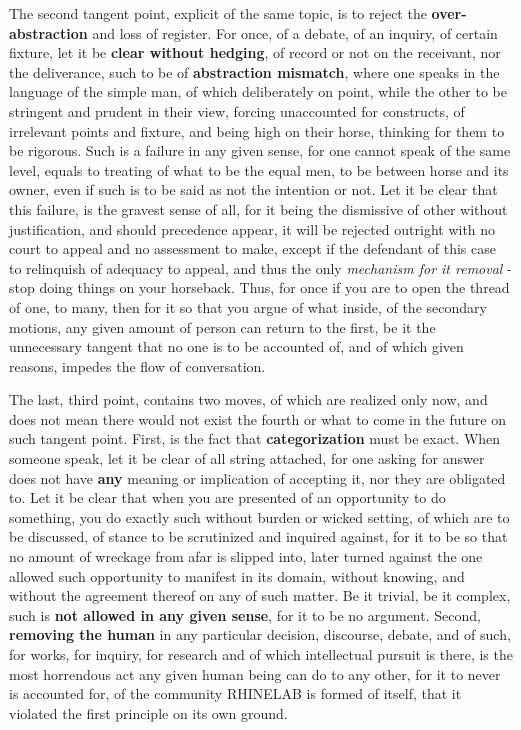 \documentclass[10pt,a4paper]{article}
\begin{document}
The second tangent point, explicit of the same topic, is to reject the \textbf{over-abstraction} and loss of register. For once, of a debate, of an inquiry, of certain fixture, let it be \textbf{clear without hedging}, of record or not on the receivant, nor the deliverance, such to be of \textbf{abstraction mismatch}, where one speaks in the language of the simple man, of which deliberately on point, while the other to be stringent and prudent in their view, forcing unaccounted for constructs, of irrelevant points and fixture, and being high on their horse, thinking for them to be rigorous. Such is a failure in any given sense, for one cannot speak of the same level, equals to treating of what to be the equal men, to be between horse and its owner, even if such is to be said as not the intention or not. Let it be clear that this failure, is the gravest sense of all, for it being the dismissive of other without justification, and should precedence appear, it will be rejected outright with no court to appeal and no assessment to make, except if the defendant of this case to relinquish of adequacy to appeal, and thus the only \textit{mechanism for it removal} - stop doing things on your horseback. Thus, for once if you are to open the thread of one, to many, then for it so that you argue of what inside, of the secondary motions, any given amount of person can return to the first, be it the unnecessary tangent that no one is to be accounted of, and of which given reasons, impedes the flow of conversation. 

The last, third point, contains two moves, of which are realized only now, and does not mean there would not exist the fourth or what to come in the future on such tangent point. First, is the fact that \textbf{categorization} must be exact. When someone speak, let it be clear of all string attached, for one asking for answer does not have \textbf{any} meaning or implication of accepting it, nor they are obligated to. Let it be clear that when you are presented of an opportunity to do something, you do exactly such without burden or wicked setting, of which are to be discussed, of stance to be scrutinized and inquired against, for it to be so that no amount of wreckage from afar is slipped into, later turned against the one allowed such opportunity to manifest in its domain, without knowing, and without the agreement thereof on any of such matter. Be it trivial, be it complex, such is \textbf{not allowed in any given sense}, for it to be no argument. Second, \textbf{removing the human} in any particular decision, discourse, debate, and of such, for works, for inquiry, for research and of which intellectual pursuit is there, is the most horrendous act any given human being can do to any other, for it to never is accounted for, of the community RHINELAB is formed of itself, that it violated the first principle on its own ground. 
\end{document}
